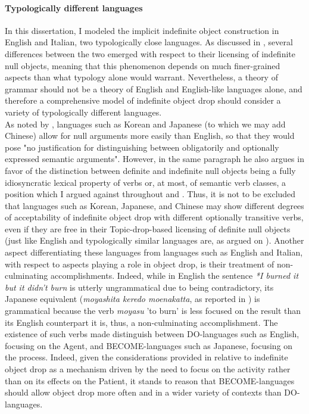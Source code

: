 \paragraph{Typologically different languages}
In this dissertation, I modeled the implicit indefinite object construction in English and Italian, two typologically close languages. As discussed in , several differences between the two emerged with respect to their licensing of indefinite null objects, meaning that this phenomenon depends on much finer-grained aspects than what typology alone would warrant. Nevertheless, a theory of grammar should not be a theory of English and English-like languages alone, and therefore a comprehensive model of indefinite object drop should consider a variety of typologically different languages.\\
As noted by \textcite[134]{Jackendoff2003}, languages such as Korean and Japanese (to which we may add Chinese) allow for null arguments more easily than English, so that they would pose "no justiﬁcation for distinguishing between obligatorily and optionally expressed semantic arguments". However, in the same paragraph he also argues in favor of the distinction between definite and indefinite null objects being a fully idiosyncratic lexical property of verbs or, at most, of semantic verb classes, a position which I argued against throughout  and . Thus, it is not to be excluded that languages such as Korean, Japanese, and Chinese may show different degrees of acceptability of indefinite object drop with different optionally transitive verbs, even if they are free in their Topic-drop-based licensing of definite null objects (just like English and typologically similar languages are, as argued on ). Another aspect differentiating these languages from languages such as English and Italian, with respect to aspects playing a role in object drop, is their treatment of non-culminating accomplishments. Indeed, while in English the sentence \textit{*I burned it but it didn't burn} is utterly ungrammatical due to being contradictory, its Japanese equivalent (\textit{moyashita keredo moenakatta}, as reported in \textcite[236]{radden2003metonymic}) is grammatical because the verb \textit{moyasu} 'to burn' is less focused on the result than its English counterpart \textemdash it is, thus, a non-culminating accomplishment. The existence of such verbs made \textcite{ikegami1991language} distinguish between DO-languages such as English, focusing on the Agent, and BECOME-languages such as Japanese, focusing on the process. Indeed, given the considerations provided in  relative to indefinite object drop as a mechanism driven by the need to focus on the activity rather than on its effects on the Patient, it stands to reason that BECOME-languages should allow object drop more often and in a wider variety of contexts than DO-languages.\\
